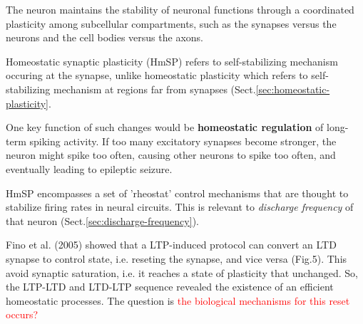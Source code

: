 The neuron  maintains the stability of neuronal functions through a
coordinated plasticity among subcellular compartments, such as the synapses
versus the neurons and the cell bodies versus the axons.

Homeostatic synaptic plasticity (HmSP) refers to self-stabilizing mechanism
occuring at the synapse, unlike homeostatic plasticity which refers to
self-stabilizing mechanism at regions far from synapses
(Sect.\ref{sec:homeostatic-plasticity}.

One key function of such changes would be {\bf homeostatic regulation} of
long-term spiking activity. If too many excitatory synapses become stronger, the
neuron  might spike too often, causing other neurons to spike too often, and
eventually leading to epileptic seizure.

HmSP encompasses a set of 'rheostat' control mechanisms that are thought to
stabilize firing rates in neural circuits. This is relevant to {\it discharge
frequency} of that neuron (Sect.\ref{sec:discharge-frequency}).




Fino et al. (2005) showed that a LTP-induced protocol can convert an LTD synapse
to control state, i.e. reseting the synapse, and vice versa (Fig.5).
This avoid synaptic saturation, i.e. it reaches a state of plasticity that
unchanged. So, the LTP-LTD and LTD-LTP sequence revealed the existence of an
efficient homeostatic processes. The question is \textcolor{red}{the biological
mechanisms for this reset occurs?}


%   


